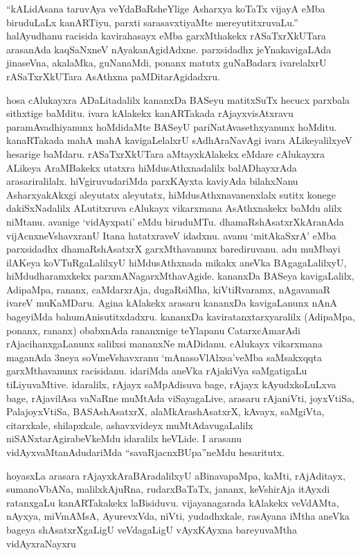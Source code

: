 \documentclass[11pt,a4size]{article}
\begin{document}
``kALidAsana taruvAya veYdaBaRsheYlige Asharxya koTaTx vijayA eMba
biruduLaLx kanARTiyu, parxti sarasavxtiyaMte mereyutitxruvaLu.''
halAyudhanu racisida kavirahasayx eMba garxMthakekx rASaTxrXkUTara
arasanAda kaqSaNxneV nAyakanAgidAdxne. parxsidadhx jeYnakavigaLAda
jinaseVna, akalaMka, guNanaMdi, ponanx matutx guNaBadarx ivarelalxrU
rASaTxrXkUTara AsAthxna paMDitarAgidadxru.

hosa cAlukayxra ADaLitadalilx kananxDa BASeyu matitxSuTx hecucx
parxbala sithxtige baMditu. ivara kAlakekx kanARTakada
rAjayxvisAtxravu paramAvadhiyanunx hoMdidaMte BASeyU
pariNatAvasethxyanunx hoMditu. kanaRTakada mahA mahA kavigaLelalxrU
sAdhAraNavAgi ivara ALikeyalilxyeV hesarige baMdaru. rASaTxrXkUTara
aMtayxkAlakekx eMdare cAlukayxra ALikeya AraMBakekx utatxra
hiMdusAthxnadalilx balADhayxrAda arasariralilalx. hiVgiruvudariMda
parxKAyxta kaviyAda bilahxNanu AsharxyakAkxgi aleyutatx aleyutatx,
hiMdusAthxnavanenxlalx sutitx konege dakiSxNadalilx ALutitxruva
cAlukayx vikarxmana AsAthxnakekx baMdu alilx niMtanu. avanige
`vidAyxpati' eMdu biruduMTu. dhamaRshAsatxrXkAranAda
vijAcnxneVshavxranU Itana hatatxraveV idadxnu. avanu `mitAkaSxrA' eMba
parxsidadhx dhamaRshAsatxrX garxMthavanunx barediruvanu. adu muMbayi
ilAKeya koVTuRgaLalilxyU hiMdusAthxnada mikakx aneVka BAgagaLalilxyU,
hiMdudharamxkekx parxmANagarxMthavAgide. kananxDa BASeya kavigaLalilx,
AdipaMpa, rananx, caMdarxrAja, dugaRsiMha, kiVtiRvaramx, nAgavamaR
ivareV muKaMDaru. Agina kAlakekx arasaru kananxDa kavigaLanunx nAnA
bageyiMda bahumAnisutitxdadxru. kananxDa kaviratanxtarxyaralilx
(AdipaMpa, ponanx, rananx) obabxnAda rananxnige teYlapanu
CatarxcAmarAdi rAjacihanxgaLanunx salilxsi mananxNe mADidanu. cAlukayx
vikarxmana maganAda 3neya soVmeVshavxranu `mAnasoVlAlxsa'veMba
saMsakxqqta garxMthavanunx racisidanu. idariMda aneVka rAjakiVya
saMgatigaLu tiLiyuvaMtive. idaralilx, rAjayx saMpAdisuva bage, rAjayx
kAyudxkoLuLxva bage, rAjavilAsa vaNaRne muMtAda viSayagaLive, arasaru
rAjaniVti, joyxVtiSa, PalajoyxVtiSa, BASAshAsatxrX, alaMkArashAsatxrX,
kAvayx, saMgiVta, citarxkale, shilapxkale, ashavxvideyx
muMtAdavugaLalilx niSANxtarAgirabeVkeMdu idaralilx heVLide. I arasanu
vidAyxvaMtanAdudariMda ``savaRjacnxBUpa''neMdu hesaritutx.

hoyasxLa arasara rAjayxkAraBAradalilxyU aBinavapaMpa, kaMti,
rAjAditayx, sumanoVbANa, malilxkAjuRna, rudarxBaTaTx,
jananx, keVshirAja itAyxdi ratanxgaLu kanARTakakekx
laBisiduvu. vijayanagarada kAlakekx veVdAMta, nAyxya, miVmAMsA,
AyurevxVda, niVti, yudadhxkale, rasAyana iMtha aneVka bageya
shAsatxrXgaLigU veVdagaLigU vAyxKAyxna bareyuvaMtha vidAyxraNayxru
\end{document}
